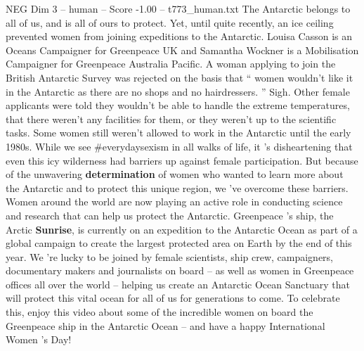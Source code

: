 \begin{textsample}{NEG Dim 3 – human – Score -1.00 – t773\_human.txt}  \label{ex:f3_neg_044}
The Antarctic belongs to all of us, and is all of ours to protect.
Yet, until quite recently, an ice ceiling prevented women from joining expeditions to the Antarctic.
Louisa Casson is an Oceans Campaigner for Greenpeace UK and Samantha Wockner is a Mobilisation Campaigner for Greenpeace Australia Pacific.
A woman applying to join the British Antarctic Survey was rejected on the basis that “ women wouldn't like it in the Antarctic as there are no shops and no hairdressers. ” Sigh.
Other female applicants were told they wouldn't be able to handle the extreme temperatures, that there weren't any facilities for them, or they weren't up to the scientific tasks.
Some women still weren't allowed to work in the Antarctic until the early 1980s.
While we see \#everydaysexism in all walks of life, it ’s disheartening that even this icy wilderness had barriers up against female participation.
But because of the unwavering \textbf{determination} of women who wanted to learn more about the Antarctic and to protect this unique region, we ’ve overcome these barriers.
Women around the world are now playing an active role in conducting science and research that can help us protect the Antarctic.
Greenpeace ’s ship, the Arctic \textbf{Sunrise}, is currently on an expedition to the Antarctic Ocean as part of a global campaign to create the largest protected area on Earth by the end of this year.
We ’re lucky to be joined by female scientists, ship crew, campaigners, documentary makers and journalists on board – as well as women in Greenpeace offices all over the world – helping us create an Antarctic Ocean Sanctuary that will protect this vital ocean for all of us for generations to come.
To celebrate this, enjoy this video about some of the incredible women on board the Greenpeace ship in the Antarctic Ocean – and have a happy International Women ’s Day!

\end{textsample}
